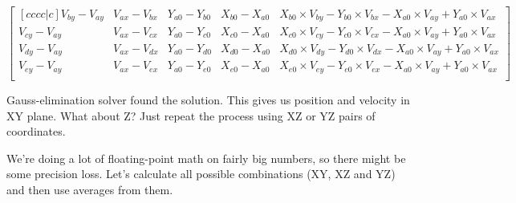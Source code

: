 \documentclass{article}
\begin{document}
\begin{displaymath}
    \begin{bmatrix}[cccc|c]
        V_{by} - V_{ay} & V_{ax} - V_{bx} & Y_{a0} - Y_{b0} & X_{b0} - X_{a0} & X_{b0} \times V_{by} - Y_{b0} \times V_{bx} - X_{a0} \times V_{ay} + Y_{a0} \times V_{ax}\\
        V_{cy} - V_{ay} & V_{ax} - V_{cx} & Y_{a0} - Y_{c0} & X_{c0} - X_{a0} & X_{c0} \times V_{cy} - Y_{c0} \times V_{cx} - X_{a0} \times V_{ay} + Y_{a0} \times V_{ax}\\
        V_{dy} - V_{ay} & V_{ax} - V_{dx} & Y_{a0} - Y_{d0} & X_{d0} - X_{a0} & X_{d0} \times V_{dy} - Y_{d0} \times V_{dx} - X_{a0} \times V_{ay} + Y_{a0} \times V_{ax}\\
        V_{ey} - V_{ay} & V_{ax} - V_{ex} & Y_{a0} - Y_{e0} & X_{e0} - X_{a0} & X_{e0} \times V_{ey} - Y_{e0} \times V_{ex} - X_{a0} \times V_{ay} + Y_{a0} \times V_{ax}\\
    \end{bmatrix}
\end{displaymath}

Gauss-elimination solver found the solution. This gives us position and velocity in XY plane. What about Z? Just repeat the process using XZ or YZ pairs of coordinates.

We're doing a lot of floating-point math on fairly big numbers, so there might be some precision loss. Let's calculate all possible combinations (XY, XZ and YZ)
and then use averages from them.
\end{document}
